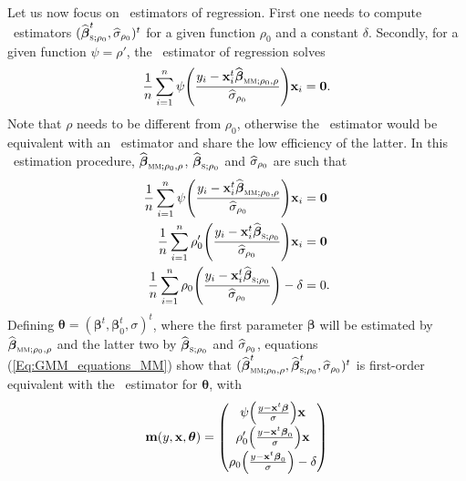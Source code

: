 Let us now focus on ~estimators of regression. First one needs to
compute ~estimators
$(\sthat{\boldsymbol\beta}_{\stsc{S};\rho_0}^t,\sthat{\sigma}_{\rho_0})^t$ for
a given function $\rho_0$ and a constant $\delta$. Secondly, for a given
function $\psi=\rho'$, the ~estimator of regression solves
\[
    \frac{1}{n} \sum_{i=1}^{n}
    \psi\left(\frac{y_i-\stvec{x}_i^t\sthat{\boldsymbol\beta}_{\stsc{MM};\rho_0,\rho}}
        {\sthat{\sigma}_{\rho_0}}\right) \stvec{x}_i = \stvec{0}.
\]
Note that $\rho$ needs to be different from $\rho_0$, otherwise the
~estimator would be equivalent with an ~estimator and share
the low efficiency of the latter. In this ~estimation procedure,
$\sthat{\boldsymbol\beta}_{\stsc{MM};\rho_0,\rho}$,
$\sthat{\boldsymbol\beta}_{\stsc{S};\rho_0}$ and $\widehat{\sigma}_{\rho_0}$ are
such that
%
\begin{equation}
    \label{Eq:GMM_equations_MM}
    \begin{aligned}
        \frac{1}{n} \sum_{i=1}^{n}
            \psi\left(\frac{y_i-\stvec{x}_i^t\sthat{\boldsymbol\beta}_{\stsc{MM};\rho_0,\rho}}
                {\sthat{\sigma}_{\rho_0}}\right) \stvec{x}_i
        & = \stvec{0}
        \\
        \frac{1}{n} \sum_{i=1}^{n}
            \rho_0'\left(\frac{y_i-\stvec{x}_i^t\sthat{\boldsymbol\beta}_{\stsc{S};\rho_0}}
            {\sthat{\sigma}_{\rho_0}}\right) \stvec{x}_i
        & = \stvec{0}
        \\
        \dfrac{1}{n} \sum_{i=1}^{n}
            \rho_0\left(\frac{y_i-\stvec{x}_i^t\sthat{\boldsymbol\beta}_{\stsc{S};\rho_0}}
                {\sthat{\sigma}_{\rho_0}}\right) - \delta
        & = 0.
    \end{aligned}
\end{equation}
%
Defining $\boldsymbol\theta =
(\boldsymbol\beta^t,\boldsymbol\beta_0^t,\sigma)^t$, where the first parameter
$\boldsymbol\beta$ will be estimated by
$\sthat{\boldsymbol\beta}_{\stsc{MM};\rho_0,\rho}$ and the latter two by
$\sthat{\boldsymbol\beta}_{\stsc{S};\rho_0}$ and $\widehat{\sigma}_{\rho_0}$,
equations (\ref{Eq:GMM_equations_MM}) show that
$(\sthat{\boldsymbol\beta}_{\stsc{MM};\rho_0,\rho}^t,
\sthat{\boldsymbol\beta}_{\stsc{S};\rho_0}^t,\sthat{\sigma}_{\rho_0})^t$ is
first-order equivalent with the ~estimator for $\boldsymbol\theta$,
with
\[
    \stvec{m}(y,\stvec{x},\boldsymbol\theta) =
    \begin{pmatrix}
        \psi\left(\frac{y-\stvec{x}^t\boldsymbol\beta}{\sigma}\right) \stvec{x}
        \\[1ex]
        \rho_0'\left(\frac{y-\stvec{x}^t\boldsymbol\beta_0}{\sigma}\right) \stvec{x}
        \\[1ex]
        \rho_0\left(\frac{y-\stvec{x}^t\boldsymbol\beta_0}{\sigma}\right) - \delta
    \end{pmatrix}
\]
